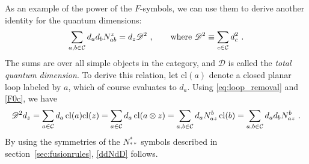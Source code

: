 As an example of the power of the $F$-symbols, we can use them to derive another identity for the quantum dimensions:
\begin{align}
\sum_{a,b \in {\cal C}} d_a d_b N_{ab}^z = d_z \mathscr{D}^2\ , \qquad \hbox{where } \mathscr{D}^2\equiv{\sum_{c \in {\cal C}} d_c^2}\ . 
\label{ddNdD}
\end{align}
The sums are over all simple objects in the category, and $\mathscr{D}$ is called the {\em total quantum dimension}. 
To derive this relation, let $\text{cl}(a)$ denote a closed planar loop labeled by $a$, which of course evaluates to $d_a$. Using \eqref{eq:loop_removal} and \eqref{F0c}, we have 
\[\mathscr{D}^2 d_z = \sum_{a \in {\cal C}} d_a \,\text{cl}(a) \text{cl}(z) = \sum_{a \in {\cal C}} d_a\, \text{cl}(a\otimes z) = \sum_{a,b \in{\cal C}} d_a N_{az}^b\, \text{cl}(b) =  \sum_{a,b \in{\cal C}} d_ad_b N_{az}^b\ .\] 
By using the symmetries of the $N_{\ast\ast}^\ast$ symbols described in section~\ref{sec:fusionrules}, \eqref{ddNdD} follows.





